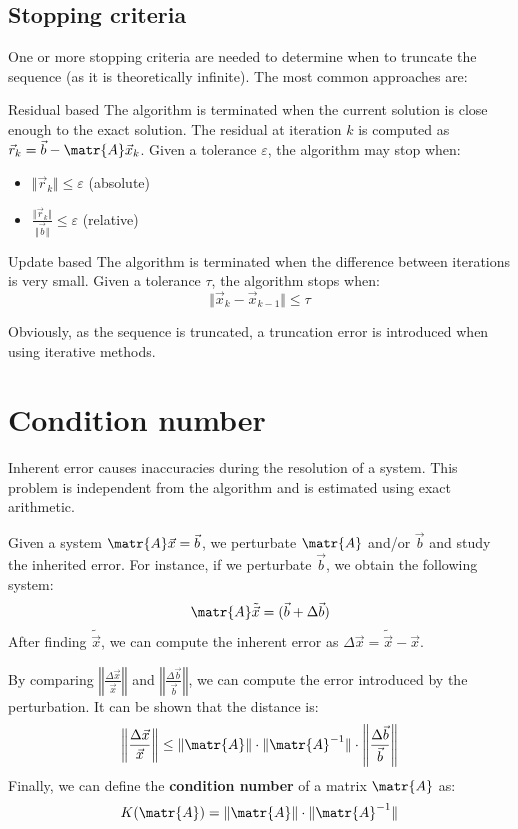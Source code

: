 \subsection{Stopping criteria}
One or more stopping criteria are needed to determine when to truncate the sequence (as it is theoretically infinite).
The most common approaches are:
\begin{descriptionlist}
    \item[Residual based]
        The algorithm is terminated when the current solution is close enough to the exact solution.
        The residual at iteration $k$ is computed as $\vec{r}_k = \vec{b} - \matr{A}\vec{x}_k$.
        Given a tolerance $\varepsilon$, the algorithm may stop when:
        \begin{itemize}
            \item $\Vert \vec{r}_k \Vert \leq \varepsilon$ (absolute)
            \item $\frac{\Vert \vec{r}_k \Vert}{\Vert \vec{b} \Vert} \leq \varepsilon$ (relative)
        \end{itemize}

    \item[Update based] 
        The algorithm is terminated when the difference between iterations is very small.
        Given a tolerance $\tau$, the algorithm stops when:
        \[ \Vert \vec{x}_{k} - \vec{x}_{k-1} \Vert \leq \tau \]
\end{descriptionlist}
Obviously, as the sequence is truncated, a truncation error is introduced when using iterative methods.



\section{Condition number}
Inherent error causes inaccuracies during the resolution of a system.
This problem is independent from the algorithm and is estimated using exact arithmetic.

Given a system $\matr{A}\vec{x} = \vec{b}$, we perturbate $\matr{A}$ and/or $\vec{b}$ and study the inherited error.
For instance, if we perturbate $\vec{b}$, we obtain the following system:
\[ \matr{A}\tilde{\vec{x}} = (\vec{b} + \Delta\vec{b}) \]
After finding $\tilde{\vec{x}}$, we can compute the inherent error as $\Delta\vec{x} = \tilde{\vec{x}} - \vec{x}$.

By comparing $\left\Vert \frac{\Delta\vec{x}}{\vec{x}} \right\Vert$ and $\left\Vert \frac{\Delta\vec{b}}{\vec{b}} \right\Vert$, 
we can compute the error introduced by the perturbation.
It can be shown that the distance is:
\[ 
    \left\Vert \frac{\Delta\vec{x}}{\vec{x}} \right\Vert \leq 
    \Vert \matr{A} \Vert \cdot \Vert \matr{A}^{-1} \Vert \cdot \left\Vert \frac{\Delta\vec{b}}{\vec{b}} \right\Vert 
\]
Finally, we can define the \textbf{condition number} of a matrix $\matr{A}$ as: 
\[ K(\matr{A}) = \Vert \matr{A} \Vert \cdot \Vert \matr{A}^{-1} \Vert \]

